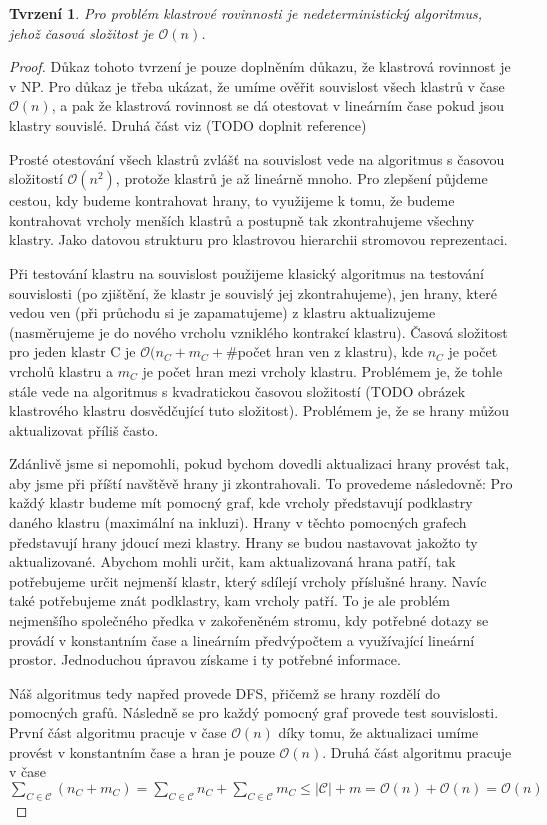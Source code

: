 \documentclass[12pt,a4report]{report}
\newtheorem{tvr3}{Tvrzení}
\begin{document}
\begin{tvr3}
Pro problém klastrové rovinnosti je nedeterministický algoritmus, jehož časová složitost je $\mathcal{O}(n)$.
\end{tvr3}
\begin{proof}
\par
Důkaz tohoto tvrzení je pouze doplněním důkazu, že klastrová rovinnost je v NP. Pro důkaz je třeba ukázat, že umíme ověřit souvislost všech klastrů v čase $\mathcal{O}(n)$, a pak že klastrová rovinnost se dá otestovat v lineárním čase pokud jsou klastry souvislé.
Druhá část viz (TODO doplnit reference)
\par
Prosté otestování všech klastrů zvlášť na souvislost vede na algoritmus s časovou složitostí $\mathcal{O}(n^2)$, protože klastrů je až lineárně mnoho. Pro zlepšení půjdeme cestou, kdy budeme kontrahovat hrany, to využijeme k tomu, že budeme kontrahovat vrcholy menších klastrů a postupně tak zkontrahujeme všechny klastry. Jako datovou strukturu pro klastrovou hierarchii stromovou reprezentaci.
\par
Při testování klastru na souvislost použijeme klasický algoritmus na testování souvislosti (po zjištění, že klastr je souvislý jej zkontrahujeme), jen hrany, které vedou ven (při průchodu si je zapamatujeme) z klastru aktualizujeme (nasměrujeme je do nového vrcholu vzniklého kontrakcí klastru). Časová složitost pro jeden klastr C je $\mathcal{O}(n_C + m_C + \#$počet hran ven z klastru), kde $n_C$ je počet vrcholů klastru a $m_C$ je počet hran mezi vrcholy klastru. Problémem je, že tohle stále vede na algoritmus s kvadratickou časovou složitostí (TODO obrázek klastrového klastru dosvědčující tuto složitost). Problémem je, že se hrany můžou aktualizovat příliš často.
\par
Zdánlivě jsme si nepomohli, pokud bychom dovedli aktualizaci hrany provést tak, aby jsme při příští navštěvě hrany ji zkontrahovali. To provedeme následovně: Pro každý klastr budeme mít pomocný graf, kde vrcholy představují podklastry daného klastru (maximální na inkluzi). Hrany v těchto pomocných grafech představují hrany jdoucí mezi klastry. Hrany se budou nastavovat jakožto ty aktualizované. Abychom mohli určit, kam aktualizovaná hrana patří, tak potřebujeme určit nejmenší klastr, který sdílejí vrcholy příslušné hrany. Navíc také potřebujeme znát podklastry, kam vrcholy patří. To je ale problém nejmenšího společného předka v zakořeněném stromu, kdy potřebné dotazy se provádí v konstantním čase a lineárním předvýpočtem a využívající lineární prostor. Jednoduchou úpravou získame i ty potřebné informace.
\par
Náš algoritmus tedy napřed provede DFS, přičemž se hrany rozdělí do pomocných grafů. Následně se pro každý pomocný graf provede test souvislosti. První část algoritmu pracuje v čase $\mathcal{O}(n)$ díky tomu, že aktualizaci umíme provést v konstantním čase a hran je pouze $\mathcal{O}(n)$. Druhá část algoritmu pracuje v čase $\sum\limits_{C \in \mathcal C}(n_C+m_C) = \sum\limits_{C \in \mathcal C}n_C + \sum\limits_{C \in \mathcal C}m_C \leq |\mathcal C| + m = \mathcal O(n) + \mathcal O(n)=\mathcal O(n)$
\end{proof}
\end{document}
